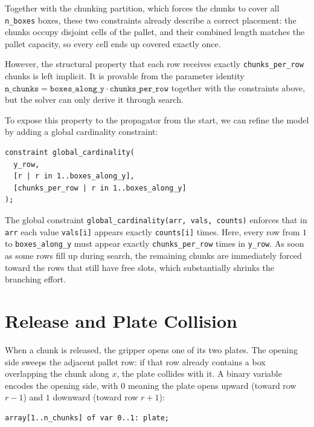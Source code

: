 Together with the chunking partition, which forces the chunks to cover all
\texttt{n\_boxes} boxes, these two constraints already describe a correct
placement: the chunks occupy disjoint cells of the pallet, and their
combined length matches the pallet capacity, so every cell ends up covered
exactly once.

However, the structural property that each row receives exactly
\texttt{chunks\_per\_row} chunks is left implicit. It is provable from the
parameter identity \(\texttt{n\_chunks} = \texttt{boxes\_along\_y} \cdot
\texttt{chunks\_per\_row}\) together with the constraints above, but the
solver can only derive it through search.

To expose this property to the propagator from the start, we can refine 
the model by adding a global cardinality constraint:

\vspace{0.5cm}
\begin{lstlisting}
constraint global_cardinality(
  y_row,
  [r | r in 1..boxes_along_y],
  [chunks_per_row | r in 1..boxes_along_y]
);
\end{lstlisting}
\vspace{0.5cm}

The global constraint \texttt{global\_cardinality(arr, vals, counts)}
enforces that in \texttt{arr} each value \texttt{vals[i]} appears exactly
\texttt{counts[i]} times. Here, every row from \(1\) to
\texttt{boxes\_along\_y} must appear exactly \texttt{chunks\_per\_row}
times in \texttt{y\_row}. As soon as some rows fill up during search, the
remaining chunks are immediately forced toward the rows that still have
free slots, which substantially shrinks the branching effort.

\section{Release and Plate Collision}
\label{sec:release}

When a chunk is released, the gripper opens one of its two plates. The
opening side sweeps the adjacent pallet row: if that row already contains a
box overlapping the chunk along \(x\), the plate collides with it. A binary
variable encodes the opening side, with \(0\) meaning the plate opens
upward (toward row \(r-1\)) and \(1\) downward (toward row \(r+1\)):

\vspace{0.5cm}
\begin{lstlisting}
array[1..n_chunks] of var 0..1: plate;
\end{lstlisting}
\vspace{0.5cm}


